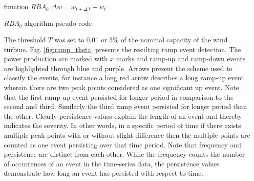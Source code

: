 \begin{algorithm}[!htbp] 
\SetAlgoLined
{}
\underline{function} $RBA_\theta$ \;
$\Delta w = w_{ t + \Delta \; t } - w_t$ \;
 \caption{$RBA_\theta$ algorithm pseudo code}
 \label{algo1}
\end{algorithm}


The threshold $T$ was set to 0.01 or 5\% of the nominal capacity of the wind turbine. Fig. \ref{fig:ramp_theta} presents the resulting ramp event detection. The power production are marked with $x$ marks and ramp-up and ramp-down events are highlighted through blue and purple. Arrows present the scheme used to classify the events, for instance a long red arrow describes a long ramp-up event wherein there are two peak points considered as one significant up event. Note that the first ramp up event persisted for longer period in comparison to the second and third. Similarly the third ramp event persisted for longer period than the other. Clearly persistence values explain the length of an event and thereby indicates the severity. In other words, in a specific period of time if there exists multiple peak points with or without slight difference then the multiple points are counted as one event persisting over that time period.
Note that frequency and persistence are distinct from each other. While the frequency counts the number of occurrences of an event in the time-series data, the persistence values demonstrate how long an event has persisted with respect to time.

